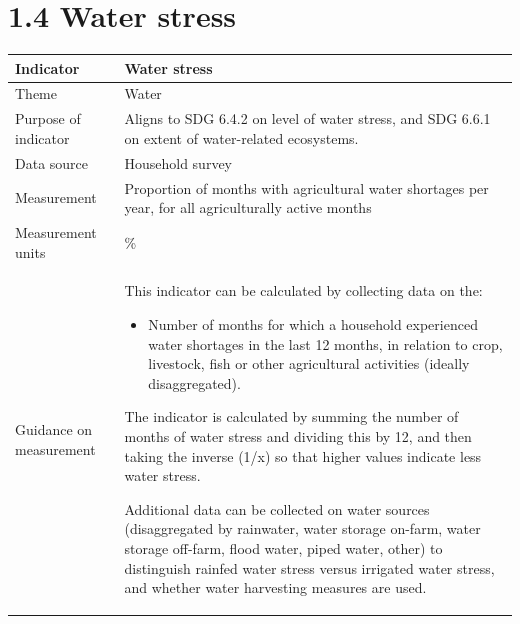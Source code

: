 \documentclass[
  letterpaper,
  DIV=11,
  numbers=noendperiod]{scrreprt}
\providecommand{\tightlist}{%
  \setlength{\itemsep}{0pt}\setlength{\parskip}{0pt}}
\begin{document}
\chapter{1.4 Water stress}\label{water-stress}

\begin{longtable}[]{@{}
  >{\raggedright\arraybackslash}p{}
  >{\raggedright\arraybackslash}p{}@{}}
\toprule\noalign{}
\begin{minipage}[b]{\linewidth}\raggedright
\textbf{Indicator}
\end{minipage} & \begin{minipage}[b]{\linewidth}\raggedright
\textbf{Water stress}
\end{minipage} \\
\midrule\noalign{}
\endhead
\bottomrule\noalign{}
\endlastfoot
Theme & Water \\
Purpose of indicator & Aligns to SDG 6.4.2 on level of water stress, and
SDG 6.6.1 on extent of water-related ecosystems. \\
Data source & Household survey \\
Measurement & Proportion of months with agricultural water shortages per
year, for all agriculturally active months \\
Measurement units & \% \\
Guidance on measurement & \begin{minipage}[t]{\linewidth}\raggedright
This indicator can be calculated by collecting data on the:

\begin{itemize}
\tightlist
\item
  Number of months for which a household experienced water shortages in
  the last 12 months, in relation to crop, livestock, fish or other
  agricultural activities (ideally disaggregated).
\end{itemize}

The indicator is calculated by summing the number of months of water
stress and dividing this by 12, and then taking the inverse (1/x) so
that higher values indicate less water stress.

Additional data can be collected on water sources (disaggregated by
rainwater, water storage on-farm, water storage off-farm, flood water,
piped water, other) to distinguish rainfed water stress versus irrigated
water stress, and whether water harvesting measures are used.


\end{minipage}
\end{longtable}
\end{document}
